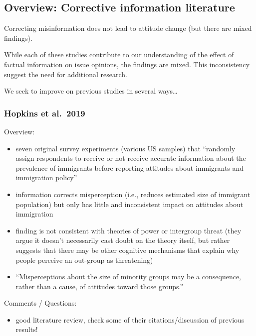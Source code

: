 \documentclass[11pt,article,oneside]{memoir}
\begin{document}
\hypertarget{overview-corrective-information-literature}{%
\subsection{Overview: Corrective information
literature}\label{overview-corrective-information-literature}}

Correcting misinformation does not lead to attitude change (but there
are mixed findings).

While each of these studies contribute to our understanding of the
effect of factual information on issue opinions, the findings are mixed.
This inconsistency suggest the need for additional research.

We seek to improve on previous studies in several ways\ldots{}

\hypertarget{hopkins-et-al.-2019}{%
\subsubsection{Hopkins et al.~2019}\label{hopkins-et-al.-2019}}

Overview:

\begin{itemize}
\tightlist
\item
  seven original survey experiments (various US samples) that ``randomly
  assign respondents to receive or not receive accurate information
  about the prevalence of immigrants before reporting attitudes about
  immigrants and immigration policy''
\item
  information corrects misperception (i.e., reduces estimated size of
  immigrant population) but only has little and inconsistent impact on
  attitudes about immigration
\item
  finding is not consistent with theories of power or intergroup threat
  (they argue it doesn't necessarily cast doubt on the theory itself,
  but rather suggests that there may be other cognitive mechanisms that
  explain why people perceive an out-group as threatening)
\item
  ``Misperceptions about the size of minority groups may be a
  consequence, rather than a cause, of attitudes toward those groups.''
\end{itemize}

Comments / Questions:

\begin{itemize}
\tightlist
\item
  good literature review, check some of their citations/discussion of
  previous results!
\end{itemize}
\end{document}
